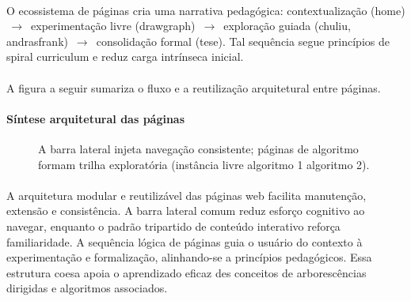 \documentclass[12pt,a4paper]{article}
\def\texttt#1{#1}%
\def\emph#1{#1}%
\def\_{}%
\begin{document}
\paragraph{}
O ecossistema de páginas cria uma narrativa pedagógica: contextualização (\texttt{home}) \,$\rightarrow$\, experimentação livre (\texttt{draw\_graph}) \,$\rightarrow$\, exploração guiada (\texttt{chuliu}, \texttt{andrasfrank}) \,$\rightarrow$\, consolidação formal (\texttt{tese}). Tal sequência segue princípios de \emph{spiral curriculum} e reduz carga intrínseca inicial.

\paragraph{}
A figura a seguir sumariza o fluxo e a reutilização arquitetural entre páginas.


\paragraph{Síntese arquitetural das páginas}
\begin{figure}[H]\centering
{}
\caption{A \texttt{barra lateral} injeta navegação consistente; páginas de algoritmo formam trilha exploratória (instância livre \textrightarrow algoritmo 1 \textrightarrow algoritmo 2).}
\end{figure}

\paragraph{}
A arquitetura modular e reutilizável das páginas web facilita manutenção, extensão e consistência. A barra lateral comum reduz esforço cognitivo ao navegar, enquanto o padrão tripartido de conteúdo interativo reforça familiaridade. A sequência lógica de páginas guia o usuário do contexto à experimentação e formalização, alinhando-se a princípios pedagógicos. Essa estrutura coesa apoia o aprendizado eficaz des conceitos de arborescências dirigidas e algoritmos associados.
\end{document}
